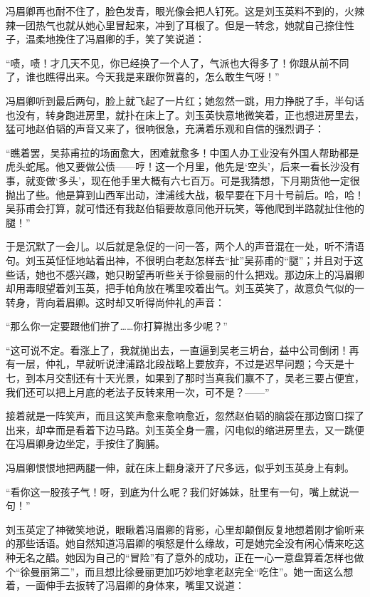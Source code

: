 \par 冯眉卿再也耐不住了，脸色发青，眼光像会把人钉死。这是刘玉英料不到的，火辣辣一团热气也就从她心里冒起来，冲到了耳根了。但是一转念，她就自己捺住性子，温柔地挽住了冯眉卿的手，笑了笑说道：
\par “啧，啧！才几天不见，你已经换了一个人了，气派也大得多了！你跟从前不同了，谁也瞧得出来。今天我是来跟你贺喜的，怎么敢生气呀！”
\par 冯眉卿听到最后两句，脸上就飞起了一片红；她忽然一跳，用力挣脱了手，半句话也没有，转身跑进房里，就扑在床上了。刘玉英快意地微笑着，正也想进房里去，猛可地赵伯韬的声音又来了，很响很急，充满着乐观和自信的强烈调子：
\par “瞧着罢，吴荪甫拉的场面愈大，困难就愈多！中国人办工业没有外国人帮助都是虎头蛇尾。他又要做公债——哼！这一个月里，他先是‘空头’，后来一看长沙没有事，就变做‘多头’，现在他手里大概有六七百万。可是我猜想，下月期货他一定很抛出了些。他是算到山西军出动，津浦线大战，极早要在下月十号前后。哈，哈！吴荪甫会打算，就可惜还有我赵伯韬要故意同他开玩笑，等他爬到半路就扯住他的腿！”
\par 于是沉默了一会儿。以后就是急促的一问一答，两个人的声音混在一处，听不清语句。刘玉英怔怔地站着出神，不很明白老赵怎样去“扯”吴荪甫的“腿”；并且对于这些话，她也不感兴趣，她只盼望再听些关于徐曼丽的什么把戏。那边床上的冯眉卿却用毒眼望着刘玉英，把手帕角放在嘴里咬着出气。刘玉英笑了，故意负气似的一转身，背向着眉卿。这时却又听得尚仲礼的声音：
\par “那么你一定要跟他们拚了……你打算抛出多少呢？”
\par “这可说不定。看涨上了，我就抛出去，一直逼到吴老三坍台，益中公司倒闭！再有一层，仲礼，早就听说津浦路北段战略上要放弃，不过是迟早问题；今天是十七，到本月交割还有十天光景，如果到了那时当真我们赢不了，吴老三要占便宜，我们还可以把上月底的老法子反转来用一次，可不是？——”
\par 接着就是一阵笑声，而且这笑声愈来愈响愈近，忽然赵伯韬的脑袋在那边窗口探了出来，却幸而是看着下边马路。刘玉英全身一震，闪电似的缩进房里去，又一跳便在冯眉卿身边坐定，手按住了胸脯。
\par 冯眉卿恨恨地把两腿一伸，就在床上翻身滚开了尺多远，似乎刘玉英身上有刺。
\par “看你这一股孩子气！呀，到底为什么呢？我们好姊妹，肚里有一句，嘴上就说一句！”
\par 刘玉英定了神微笑地说，眼瞅着冯眉卿的背影，心里却颠倒反复地想着刚才偷听来的那些话语。她自然知道冯眉卿的嗔怒是什么缘故，可是她完全没有闲心情来吃这种无名之醋。她因为自己的“冒险”有了意外的成功，正在一心一意盘算着怎样也做个“徐曼丽第二”，而且想比徐曼丽更加巧妙地拿老赵完全“吃住”。她一面这么想着，一面伸手去扳转了冯眉卿的身体来，嘴里又说道：
